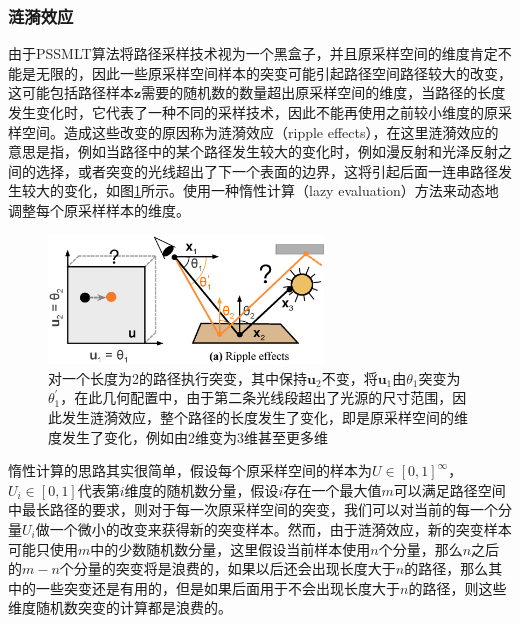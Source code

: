 \subsubsection{涟漪效应}
由于PSSMLT算法将路径采样技术视为一个黑盒子，并且原采样空间的维度肯定不能是无限的，因此一些原采样空间样本的突变可能引起路径空间路径较大的改变，这可能包括路径样本$\mathbf{z}$需要的随机数的数量超出原采样空间的维度，当路径的长度发生变化时，它代表了一种不同的采样技术，因此不能再使用之前较小维度的原采样空间。造成这些改变的原因称为涟漪效应（ripple effects），在这里涟漪效应的意思是指，例如当路径中的某个路径发生较大的变化时，例如漫反射和光泽反射之间的选择，或者突变的光线超出了下一个表面的边界，这将引起后面一连串路径发生较大的变化，如图\ref{f:mlt-ripple-effects}所示。\cite{a:ASimpleandRobustMutationStrategyfortheMetropolisLightTransportAlgorithm}使用一种惰性计算（lazy evaluation）方法来动态地调整每个原采样样本的维度。

\begin{figure}
	\sidecaption
	\includegraphics[width=0.65\textwidth]{figures/mlt/ripple-effects}
	\caption{对一个长度为2的路径执行突变，其中保持$\mathbf{u}_2$不变，将$\mathbf{u}_1$由$\theta_1$突变为$\theta^{'}_1$，在此几何配置中，由于第二条光线段超出了光源的尺寸范围，因此发生涟漪效应，整个路径的长度发生了变化，即是原采样空间的维度发生了变化，例如由2维变为3维甚至更多维}
	\label{f:mlt-ripple-effects}
\end{figure}

惰性计算的思路其实很简单，假设每个原采样空间的样本为$U\in[0,1]^{\infty}$，$U_i\in[0,1]$代表第$i$维度的随机数分量，假设$i$存在一个最大值$m$可以满足路径空间中最长路径的要求，则对于每一次原采样空间的突变，我们可以对当前的每一个分量$U_i$做一个微小的改变来获得新的突变样本。然而，由于涟漪效应，新的突变样本可能只使用$m$中的少数随机数分量，这里假设当前样本使用$n$个分量，那么$n$之后的$m-n$个分量的突变将是浪费的，如果以后还会出现长度大于$n$的路径，那么其中的一些突变还是有用的，但是如果后面用于不会出现长度大于$n$的路径，则这些维度随机数突变的计算都是浪费的。

